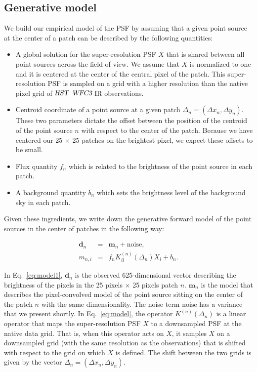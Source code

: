 \subsection{Generative model}

We build our empirical model of the PSF by assuming that a given point source at the center of a patch can be described by 
the following quantities: 

\begin{itemize}
\item A global solution for the super-resolution PSF $X$ that is shared between all point sources across the field of view. We assume 
that $X$ is normalized to one and it is centered at the center of the central pixel of the patch. This super-resolution PSF is sampled on 
a grid with a higher resolution than the native pixel grid of ${\textsl{HST}}$ ${\textsl{WFC3}}$ IR observations.

\item Centroid coordinate of a point source at a given patch $\Delta_n = (\Delta x_n, \Delta y_n)$. 
These two parameters dictate the offset between the position of the centroid of the point source $n$ with 
respect to the center of the patch. Because we have centered our 25 $\times$ 25 patches on the brightest pixel, we expect these offsets to be small.

\item Flux quantity $f_n$ which is related to the brightness of the point source in each patch.

\item A background quantity $b_n$ which sets the brightness level of the background sky in each patch.

\end{itemize}

Given these ingredients, we write down the generative forward model of the point sources in the center of patches in the following way:

\begin{eqnarray} \mathbf{d}_{n} &=& \mathbf{m}_{n} + \mathrm{noise}, \label{eq:model1} \\
       m_{n,i} &=& f_{n}K^{(n)}_{il} (\Delta_n) X_{l} + b_{n}. 
\label{eq:model}
\end{eqnarray} 

In Eq.~\ref{eq:model1}, $\mathbf{d}_{n}$ is the observed 625-dimensional vector describing the brightness of the pixels in the 25 pixels $\times$ 25 pixels patch $n$. 
$\mathbf{m}_{n}$ is the model that describes the pixel-convolved model of the point source sitting on the center of the patch $n$ with the same dimensionality. The 
noise term $\mathrm{noise}$ has a variance that we present shortly.
In Eq.~\ref{eq:model}, the operator $K^{(n)}(\Delta_n)$ is a linear operator that maps the super-resolution PSF $X$ to a downsampled PSF at the native 
data grid. That is, when this operator acts on $X$, it samples $X$ on a downsampled grid (with the same resolution as the observations) 
that is shifted with respect to the grid on which $X$ is defined. The shift between the two grids is given by the vector $\Delta_n = (\Delta x_n , \Delta y_n)$.


